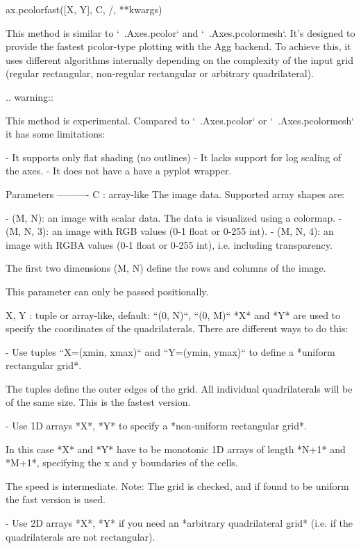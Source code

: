\begin{DoxyVerb}
\begin{DoxyVerb}
  ax.pcolorfast([X, Y], C, /, **kwargs)

This method is similar to `~.Axes.pcolor` and `~.Axes.pcolormesh`.
It's designed to provide the fastest pcolor-type plotting with the
Agg backend. To achieve this, it uses different algorithms internally
depending on the complexity of the input grid (regular rectangular,
non-regular rectangular or arbitrary quadrilateral).

.. warning::

   This method is experimental. Compared to `~.Axes.pcolor` or
   `~.Axes.pcolormesh` it has some limitations:

   - It supports only flat shading (no outlines)
   - It lacks support for log scaling of the axes.
   - It does not have a have a pyplot wrapper.

Parameters
----------
C : array-like
    The image data. Supported array shapes are:

    - (M, N): an image with scalar data. The data is visualized
      using a colormap.
    - (M, N, 3): an image with RGB values (0-1 float or 0-255 int).
    - (M, N, 4): an image with RGBA values (0-1 float or 0-255 int),
      i.e. including transparency.

    The first two dimensions (M, N) define the rows and columns of
    the image.

    This parameter can only be passed positionally.

X, Y : tuple or array-like, default: ``(0, N)``, ``(0, M)``
    *X* and *Y* are used to specify the coordinates of the
    quadrilaterals. There are different ways to do this:

    - Use tuples ``X=(xmin, xmax)`` and ``Y=(ymin, ymax)`` to define
      a *uniform rectangular grid*.

      The tuples define the outer edges of the grid. All individual
      quadrilaterals will be of the same size. This is the fastest
      version.

    - Use 1D arrays *X*, *Y* to specify a *non-uniform rectangular
      grid*.

      In this case *X* and *Y* have to be monotonic 1D arrays of length
      *N+1* and *M+1*, specifying the x and y boundaries of the cells.

      The speed is intermediate. Note: The grid is checked, and if
      found to be uniform the fast version is used.

    - Use 2D arrays *X*, *Y* if you need an *arbitrary quadrilateral
      grid* (i.e. if the quadrilaterals are not rectangular).


\end{DoxyVerb}
\end{DoxyVerb}
